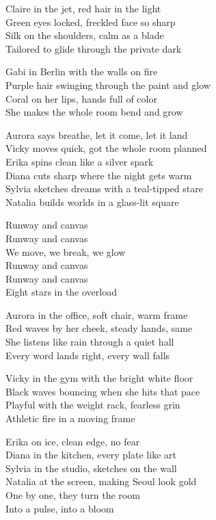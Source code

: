 \begin{lyrics}
Claire in the jet, red hair in the light\\
Green eyes locked, freckled face so sharp\\
Silk on the shoulders, calm as a blade\\
Tailored to glide through the private dark

Gabi in Berlin with the walls on fire\\
Purple hair swinging through the paint and glow\\
Coral on her lips, hands full of color\\
She makes the whole room bend and grow

Aurora says breathe, let it come, let it land\\
Vicky moves quick, got the whole room planned\\
Erika spins clean like a silver spark\\
Diana cuts sharp where the night gets warm\\
Sylvia sketches dreams with a teal-tipped stare\\
Natalia builds worlds in a glass-lit square

Runway and canvas\\
Runway and canvas\\
We move, we break, we glow\\
Runway and canvas\\
Runway and canvas\\
Eight stars in the overload

Aurora in the office, soft chair, warm frame\\
Red waves by her cheek, steady hands, same\\
She listens like rain through a quiet hall\\
Every word lands right, every wall falls

Vicky in the gym with the bright white floor\\
Black waves bouncing when she hits that pace\\
Playful with the weight rack, fearless grin\\
Athletic fire in a moving frame

Erika on ice, clean edge, no fear\\
Diana in the kitchen, every plate like art\\
Sylvia in the studio, sketches on the wall\\
Natalia at the screen, making Seoul look gold\\
One by one, they turn the room\\
Into a pulse, into a bloom


\end{lyrics}

